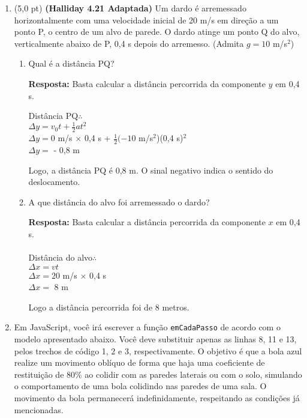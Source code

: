 \documentclass[12pt,a4paper,oneside]{article}
\begin{document}
\begin{enumerate}
	
	\item (5,0 pt) {\bf (Halliday 4.21 Adaptada)} Um dardo é arremessado horizontalmente com uma velocidade inicial de 20 m/s em direção a um ponto P, o centro de um alvo de parede. O dardo atinge um ponto Q do alvo, verticalmente abaixo de P, 0,4 s depois do arremesso. \label{q:dardo} (Admita $g = 10$ m/s$^2$)
	\begin{enumerate}
		\item Qual é a distância PQ?
		
		{\color{blue} {\bf Resposta:} Basta calcular a distância percorrida da componente $y$ em 0,4 s.
			
			\vspace{0.3cm}
			
			Distância PQ$\therefore$ \\
			$\Delta y = v_0t + \frac{1}{2}at^2$\\
			$\Delta y = 0$ m/s $\times$ 0,4 s + $\frac{1}{2}(-10$ m/s$^2$)(0,4 s)$^2$\\
			$\Delta y =$ - 0,8 m
			
			\vspace{0.3cm}
			
			Logo, a distância PQ é 0,8 m. O sinal negativo indica o sentido do deslocamento.
		}
		\item A que distância do alvo foi arremessado o dardo?
		
			{\color{blue} {\bf Resposta:} Basta calcular a distância percorrida da componente $x$ em 0,4 s.\\
			\\
			Distância do alvo$\therefore$ \\
			$\Delta x = vt$\\
			$\Delta x = 20$ m/s $\times$ 0,4 s\\
			$\Delta x =$ 8 m
			
			\vspace{0.3cm}
			
			Logo a distância percorrida foi de 8 metros.
		}
	
	\end{enumerate}

	\newpage

	\item Em JavaScript, você irá escrever a função {\tt emCadaPasso} de acordo com o modelo apresentado abaixo. Você deve substituir apenas as linhas 8, 11 e 13, pelos trechos de código 1, 2 e 3, respectivamente. O objetivo é que a bola azul realize um movimento oblíquo de forma que haja uma coeficiente de restituição de 80\% ao colidir com as paredes laterais ou com o solo, simulando o comportamento de uma bola colidindo nas paredes de uma sala. O movimento da bola permanecerá indefinidamente, respeitando as condições já mencionadas.


\end{enumerate}
\end{document}
